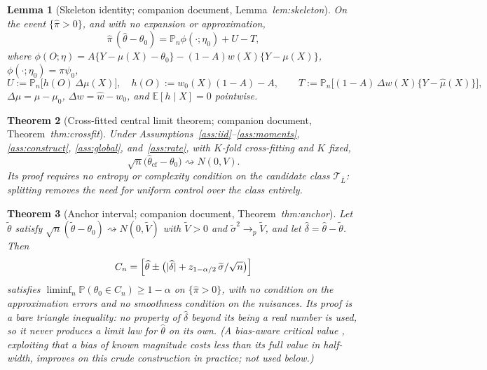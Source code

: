 \documentclass[11pt]{article}
\theoremstyle{plain}
\newtheorem{theorem}{Theorem}[section]
\newtheorem{lemma}[theorem]{Lemma}
\theoremstyle{definition}
\theoremstyle{remark}
\newcommand{\E}{\mathbb{E}}
\newcommand{\PP}{\mathbb{P}}
\newcommand{\Pn}{\mathbb{P}_n}
\newcommand{\cT}{\mathcal{T}}
\newcommand{\mz}{\mu_0}
\newcommand{\wz}{w_0}
\newcommand{\mhat}{\widehat{\mu}}
\newcommand{\what}{\widehat{w}}
\newcommand{\thetahat}{\widehat{\theta}}
\newcommand{\thetatil}{\widetilde{\theta}}
\newcommand{\pihat}{\widehat{\pi}}
\DeclarePairedDelimiter{\abs}{\lvert}{\rvert}
\begin{document}
\begin{lemma}[Skeleton identity; companion document, Lemma~\emph{lem:skeleton}]
\label{lem:skeleton}
On the event $\{\pihat>0\}$, and with no expansion or approximation,
\begin{equation}\label{eq:skeleton}
  \pihat\,(\thetahat-\theta_0)=\Pn\phi(\cdot;\eta_0)+U-T,
\end{equation}
where $\phi(O;\eta)=A\{Y-\mu(X)-\theta_0\}-(1-A)w(X)\{Y-\mu(X)\}$,
$\phi(\cdot;\eta_0)=\pi\psi_0$,
\[
  U:=\Pn\bigl[h(O)\,\Delta\mu(X)\bigr],\quad
  h(O):=\wz(X)(1-A)-A,
  \qquad
  T:=\Pn\bigl[(1-A)\,\Delta w(X)\{Y-\mhat(X)\}\bigr],
\]
$\Delta\mu=\mhat-\mz$, $\Delta w=\what-\wz$, and $\E[h\mid X]=0$ pointwise.
\end{lemma}

\begin{theorem}[Cross-fitted central limit theorem; companion document,
Theorem~\emph{thm:crossfit}]\label{thm:crossfit}
Under Assumptions~\ref{ass:iid}--\ref{ass:moments},
\ref{ass:construct}, \ref{ass:global}, and~\ref{ass:rate}, with $K$-fold
cross-fitting and $K$ fixed,
\[
  \sqrt n\bigl(\thetahat_{\mathrm{cf}}-\theta_0\bigr)\rightsquigarrow N(0,V).
\]
Its proof requires no entropy or complexity condition on the candidate
class $\cT_{\bar L}$: splitting removes the need for uniform control over
the class entirely.
\end{theorem}

\begin{theorem}[Anchor interval; companion document, Theorem~\emph{thm:anchor}]
\label{thm:anchor}
Let $\thetatil$ satisfy $\sqrt n(\thetatil-\theta_0)\rightsquigarrow
N(0,\widetilde V)$ with $\widetilde V>0$ and $\widetilde\sigma^2\to_p
\widetilde V$, and let $\widehat\delta=\thetahat-\thetatil$. Then
\[
  C_n=\Bigl[\thetahat\pm\bigl(\abs{\widehat\delta}
   +z_{1-\alpha/2}\,\widetilde\sigma/\sqrt n\bigr)\Bigr]
\]
satisfies $\liminf_n\PP(\theta_0\in C_n)\ge1-\alpha$ on $\{\pihat>0\}$, with
no condition on the approximation errors and no smoothness condition on the
nuisances. Its proof is a bare triangle inequality: no property of
$\widehat\delta$ beyond its being a real number is used, so it never
produces a limit law for $\thetahat$ on its own. (A bias-aware critical
value \citep{armstrong2018}, exploiting that a bias of known magnitude
costs less than its full value in half-width, improves on this crude
construction in practice; not used below.)
\end{theorem}
\end{document}
